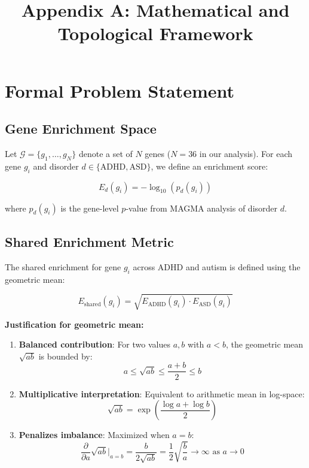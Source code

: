 \documentclass[12pt,letterpaper]{article}
\title{\textbf{Appendix A: Mathematical and Topological Framework}}
\author{}
\date{}
\theoremstyle{definition}
\theoremstyle{remark}
\begin{document}
\maketitle

\section{Formal Problem Statement}

\subsection{Gene Enrichment Space}

Let $\mathcal{G} = \{g_1, \ldots, g_N\}$ denote a set of $N$ genes ($N=36$ in our analysis). For each gene $g_i$ and disorder $d \in \{\text{ADHD}, \text{ASD}\}$, we define an enrichment score:

\begin{equation}
E_d(g_i) = -\log_{10}(p_d(g_i))
\end{equation}

where $p_d(g_i)$ is the gene-level $p$-value from MAGMA analysis of disorder $d$.

\subsection{Shared Enrichment Metric}

The shared enrichment for gene $g_i$ across ADHD and autism is defined using the geometric mean:

\begin{equation}
E_{\text{shared}}(g_i) = \sqrt{E_{\text{ADHD}}(g_i) \cdot E_{\text{ASD}}(g_i)}
\end{equation}

\textbf{Justification for geometric mean:}

\begin{enumerate}
    \item \textbf{Balanced contribution}: For two values $a, b$ with $a < b$, the geometric mean $\sqrt{ab}$ is bounded by:
    \begin{equation}
    a \leq \sqrt{ab} \leq \frac{a+b}{2} \leq b
    \end{equation}
    
    \item \textbf{Multiplicative interpretation}: Equivalent to arithmetic mean in log-space:
    \begin{equation}
    \sqrt{ab} = \exp\left(\frac{\log a + \log b}{2}\right)
    \end{equation}
    
    \item \textbf{Penalizes imbalance}: Maximized when $a = b$:
    \begin{equation}
    \frac{\partial}{\partial a}\sqrt{ab}\bigg|_{a=b} = \frac{b}{2\sqrt{ab}} = \frac{1}{2}\sqrt{\frac{b}{a}} \rightarrow \infty \text{ as } a \rightarrow 0
    \end{equation}
\end{enumerate}
\end{document}

